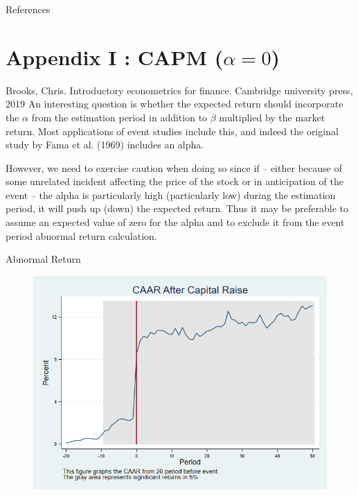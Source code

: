 \documentclass{beamer}
\begin{document}
%


	\tiny
\begin{frame}[allowframebreaks]{References}
	
	{		
		
		
	}
\end{frame}

\normalsize





\appendix

\section{Appendix I : CAPM ($ \alpha = 0 $)}


\begin{frame}
	\begin{block}{\footnotesize Brooks, Chris. Introductory econometrics for finance. Cambridge university press, 2019}
		\scriptsize
		An interesting question is whether the expected return should
		incorporate the $ \alpha $ from the estimation period in addition to $ \beta $ multiplied by the market return.
		Most applications of event studies include this, and indeed the original study by Fama et al. (1969) includes an alpha.
		
		However, we need to exercise caution when doing so since if – either
		because of some unrelated incident affecting the price of the stock or in
		anticipation of the event – the alpha is particularly high (particularly low) during the estimation period, it will push up (down) the expected return.
		Thus it may be preferable to assume an expected value of zero for the
		alpha and to exclude it from the event period abnormal return calculation.
	\end{block}
\end{frame}

\begin{frame}{Abnormal Return}
	\label{car_withoutalpha}
	\begin{figure}
		\centering
		\includegraphics[width=0.7\linewidth]{Output/car_withoutalpha.png}
		\label{fig:car_withoutalpha}
	\end{figure}
\end{frame}
\end{document}
